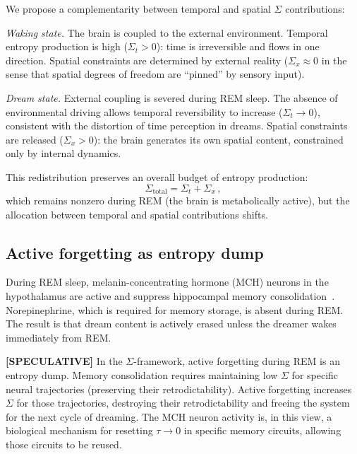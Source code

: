 \documentclass[prl,twocolumn,superscriptaddress,longbibliography,floatfix]{revtex4-2}
\newcommand{\tauasym}{\tau}
\begin{document}
We propose a complementarity between temporal and spatial $\Sigma$
contributions:

\emph{Waking state.}  The brain is coupled to the external
environment.  Temporal entropy production is high ($\Sigma_t > 0$):
time is irreversible and flows in one direction.  Spatial constraints
are determined by external reality ($\Sigma_x \approx 0$ in the
sense that spatial degrees of freedom are ``pinned'' by sensory
input).

\emph{Dream state.}  External coupling is severed during REM
sleep.  The absence of environmental driving allows temporal
reversibility to increase ($\Sigma_t \to 0$), consistent with
the distortion of time perception in dreams.
Spatial constraints are released ($\Sigma_x > 0$): the brain
generates its own spatial content, constrained only by internal
dynamics.

This redistribution preserves an overall budget of entropy
production:
\begin{equation}
\Sigma_{\mathrm{total}} = \Sigma_t + \Sigma_x\,,
\end{equation}
which remains nonzero during REM (the brain is metabolically active),
but the allocation between temporal and spatial contributions shifts.

\subsection{Active forgetting as entropy dump}
\label{subsec:forgetting}

During REM sleep, melanin-concentrating hormone (MCH) neurons in
the hypothalamus are active and suppress hippocampal memory
consolidation~\cite{NIH2019}.  Norepinephrine, which is required
for memory storage, is absent during REM.  The result is that dream
content is actively erased unless the dreamer wakes immediately from
REM.

\textbf{[SPECULATIVE]}
In the $\Sigma$-framework, active forgetting during REM is an
entropy dump.  Memory consolidation requires maintaining low
$\Sigma$ for specific neural trajectories (preserving their
retrodictability).  Active forgetting increases $\Sigma$ for those
trajectories, destroying their retrodictability and freeing the
system for the next cycle of dreaming.  The MCH neuron activity
is, in this view, a biological mechanism for resetting
$\tauasym \to 0$ in specific memory circuits, allowing those
circuits to be reused.
\end{document}
